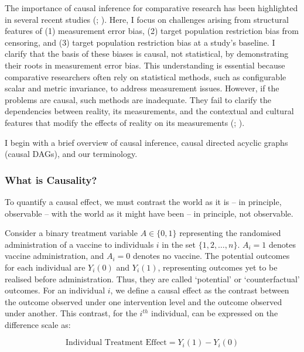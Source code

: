 \documentclass[
  single column]{article}
\begin{document}
The importance of causal inference for comparative research has been
highlighted in several recent studies
(;
). Here, I focus on
challenges arising from structural features of (1) measurement error
bias, (2) target population restriction bias from censoring, and (3)
target population restriction bias at a study's baseline. I clarify that
the basis of these biases is causal, not statistical, by demonstrating
their roots in measurement error bias. This understanding is essential
because comparative researchers often rely on statistical methods, such
as configurable scalar and metric invariance, to address measurement
issues. However, if the problems are causal, such methods are
inadequate. They fail to clarify the dependencies between reality, its
measurements, and the contextual and cultural features that modify the
effects of reality on its measurements
(;
).

I begin with a brief overview of causal inference, causal directed
acyclic graphs (causal DAGs), and our terminology.

\subsubsection{What is Causality?}\label{what-is-causality}

To quantify a causal effect, we must contrast the world as it is -- in
principle, observable -- with the world as it might have been -- in
principle, not observable.

Consider a binary treatment variable \(A \in \{0,1\}\) representing the
randomised administration of a vaccine to individuals \(i\) in the set
\(\{1, 2, \ldots, n\}\). \(A_i = 1\) denotes vaccine administration, and
\(A_i = 0\) denotes no vaccine. The potential outcomes for each
individual are \(Y_i(0)\) and \(Y_i(1)\), representing outcomes yet to
be realised before administration. Thus, they are called `potential' or
`counterfactual' outcomes. For an individual \(i\), we define a causal
effect as the contrast between the outcome observed under one
intervention level and the outcome observed under another. This
contrast, for the \(i^{th}\) individual, can be expressed on the
difference scale as:

\[
\text{Individual Treatment Effect} = Y_i(1) - Y_i(0)
\]
\end{document}
